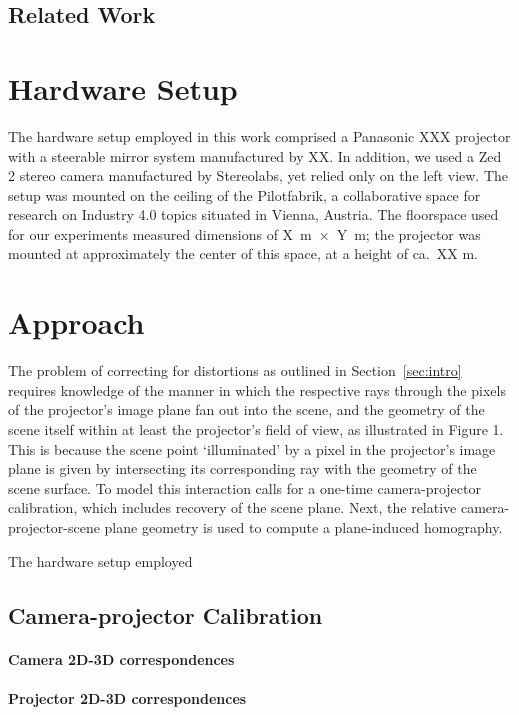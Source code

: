 \documentclass[review]{elsarticle}
\begin{document}
\subsection{Related Work}

\section{Hardware Setup}

The hardware setup employed in this work comprised a Panasonic XXX projector with a steerable mirror system manufactured by XX. In addition, we used a Zed 2 stereo camera manufactured by Stereolabs, yet relied only on the left view. The setup was mounted on the ceiling of the Pilotfabrik, a collaborative space for research on Industry 4.0 topics situated in Vienna, Austria. The floorspace used for our experiments measured dimensions of X~m~$\times$~Y~m; the projector was mounted at approximately the center of this space, at a height of ca.\ XX m. 

\section{Approach}


The problem of correcting for distortions as outlined in Section~\ref{sec:intro} requires knowledge of the manner in which the respective rays through the pixels of the projector's image plane fan out into the scene, and the geometry of the scene itself within at least the projector’s field of view, as illustrated in Figure 1. This is because the scene point `illuminated' by a pixel in the projector's image plane is given by intersecting its corresponding ray with the geometry of the scene surface. To model this interaction calls for a one-time camera-projector calibration, which includes recovery of the scene plane. Next, the relative camera-projector-scene plane geometry is used to compute a plane-induced homography.

The hardware setup employed 

\subsection{Camera-projector Calibration}

\paragraph{Camera 2D-3D correspondences}

\paragraph{Projector 2D-3D correspondences}
\end{document}
